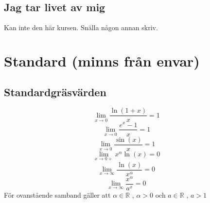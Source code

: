 \documentclass[10pt,a4paper]{article}
\begin{document}
\subsection{Jag tar livet av mig}
Kan inte den här kursen. Snälla någon annan skriv.

\section{Standard (minns från envar)}

\subsection{Standardgräsvärden}
\begin{equation}
\lim_{x\to 0} \frac{\ln(1+x)}{x}=1
\end{equation}
\begin{equation}
\lim_{x\to 0} \frac{e^x-1}{x}=1
\end{equation}
\begin{equation}
\lim_{x\to 0} \frac{\sin(x)}{x}=1
\end{equation}
\begin{equation}
\lim_{x\to 0+} x^\alpha \ln(x)=0
\end{equation}
\begin{equation}
\lim_{x\to \infty} \frac{\ln(x)}{x^\alpha}=0
\end{equation}
\begin{equation}
\lim_{x\to \infty} \frac{x^\alpha}{a^x}=0
\end{equation}
För ovanstående samband gäller att $\alpha \in \mathbb{R}$ , $\alpha >0$ och $a \in \mathbb{R}$ , $a > 1$
\end{document}
